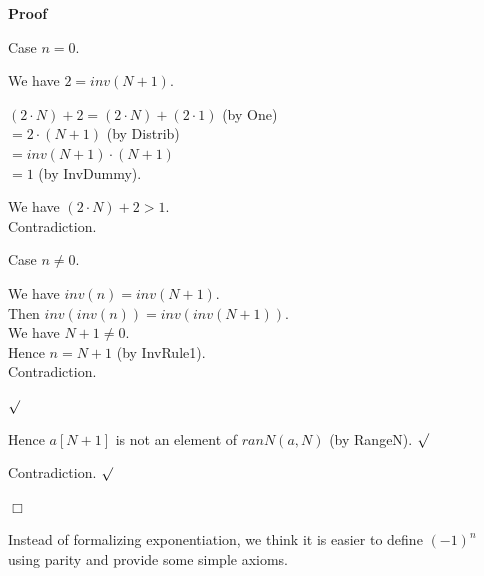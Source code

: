 \documentclass{article}
\newenvironment{forthel}{\begin{leftbar}}{\end{leftbar}}
\newenvironment{proof}{\noindent\textbf{Proof\ }}{\hspace*{\fill}$\Box$\medskip}
\newenvironment{subproof}{\begin{list}{}{}
		\item[\text{Proof}]}{\hfill $\surd$ \end{list}}
\newenvironment{case}{\begin{list}{}{}
		\item[]}{\end{list}}
\newcommand{\dotequal}{=}
\begin{document}
\begin{forthel}
\begin{proof}
\begin{subproof}
\begin{subproof}
\begin{subproof}
					Case $n = 0$.
					\begin{case}
						We have $2 = inv(N + 1)$.
						
						$(2 \cdot N) + 2 \dotequal (2 \cdot N) + (2 \cdot 1)$ (by One)\\
						$\dotequal 2 \cdot (N + 1)$ (by Distrib)\\
						$\dotequal inv(N + 1) \cdot (N + 1)$\\
						$\dotequal 1$ (by InvDummy).
						
						We have $(2 \cdot N) + 2 > 1$.\\
						Contradiction.
					\end{case}
					Case $n \neq 0$.
					\begin{case}
						We have $inv(n) = inv(N + 1)$.\\
						Then $inv(inv(n)) = inv(inv(N + 1))$.\\
						We have $N + 1 \neq 0$.\\
						Hence $n = N + 1$ (by InvRule1).\\
						Contradiction.
					\end{case}
				\end{subproof}
				Hence $a[N + 1]$ is not an element of $ranN(a,N)$ (by RangeN).
			\end{subproof}
			Contradiction.
		\end{subproof}
	\end{proof}
\end{forthel}

\noindent Instead of formalizing exponentiation, we think it is easier to define $(-1)^{n}$ using parity and provide some simple axioms.
\end{document}
